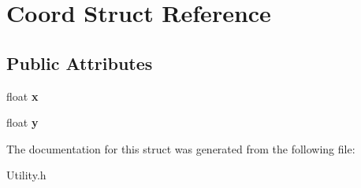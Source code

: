 \hypertarget{struct_coord}{\section{Coord Struct Reference}
\label{struct_coord}
}
\subsection*{Public Attributes}
\begin{DoxyCompactItemize}
\item 
\hypertarget{struct_coord_a089b098faaca481f53834c7cd7605da5}{float {\bfseries x}}\label{struct_coord_a089b098faaca481f53834c7cd7605da5}

\item 
\hypertarget{struct_coord_a55a67a26b632758699c9f999348d9f06}{float {\bfseries y}}\label{struct_coord_a55a67a26b632758699c9f999348d9f06}

\end{DoxyCompactItemize}


The documentation for this struct was generated from the following file\-:\begin{DoxyCompactItemize}
\item 
Utility.\-h\end{DoxyCompactItemize}
